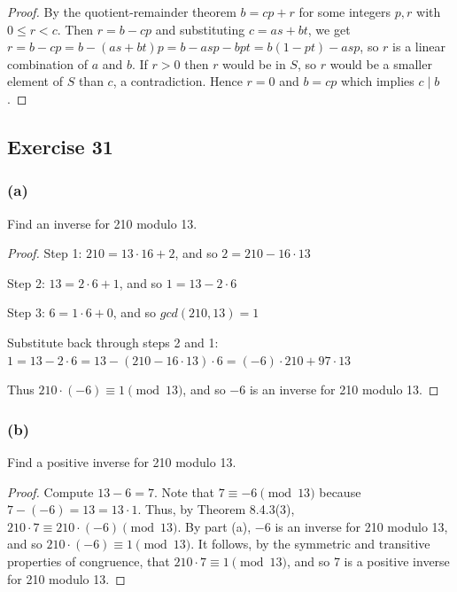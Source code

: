 \documentclass[14pt]{extarticle}
\newcommand{\cy}{\color{cyan}}
\begin{document}
\begin{proof}
        By the quotient-remainder theorem \(b = cp + r\) for some integers \(p,r\) with \(0 \leq r < c\). Then \(r = b - cp\)
        and substituting \(c = as+bt\), we get \(r = b - cp = b-(as+bt)p = b - asp - bpt = b(1-pt) - asp\), so $r$ is a
        linear combination of $a$ and $b$. If \(r > 0\) then $r$ would be in $S$, so $r$ would be a smaller element of $S$
        than $c$, a contradiction. Hence $r = 0$ and \(b = cp\) which implies \(c \mid b\).
\end{proof}

\subsection{Exercise 31}
\subsubsection{(a)}
Find an inverse for 210 modulo 13.

\begin{proof}
        {\cy Step 1:} \(210 = 13 \cdot 16 + 2\), and so \(2 = 210 - 16 \cdot 13\)

        {\cy Step 2:} \(13 = 2 \cdot 6 + 1\), and so \(1 = 13 - 2 \cdot 6\)

        {\cy Step 3:} \(6 = 1 \cdot 6 + 0\), and so \(gcd(210, 13) = 1\)

        Substitute back through steps 2 and 1:
        \(1 = 13 - 2 \cdot 6 = 13 - (210 - 16 \cdot 13) \cdot 6 = (-6) \cdot 210 + 97 \cdot 13\)

        Thus \(210 \cdot (-6) \equiv 1 \pmod{13}\), and so \(-6\) is an inverse for 210 modulo 13.
\end{proof}

\subsubsection{(b)}
Find a positive inverse for 210 modulo 13.

\begin{proof}
        Compute \(13 - 6 = 7\). Note that \(7 \equiv -6 \pmod{13}\) because \(7 - (-6) = 13 = 13 \cdot 1\). Thus, by Theorem
        8.4.3(3), \(210 \cdot 7 \equiv 210 \cdot (-6) \pmod{13}\). By part (a), \(-6\) is an inverse for 210 modulo 13, and so
        \(210 \cdot (-6) \equiv 1 \pmod{13}\). It follows, by the symmetric and transitive properties of congruence, that
        \(210 \cdot 7 \equiv 1 \pmod{13}\), and so 7 is a positive inverse for 210 modulo 13.
\end{proof}
\end{document}
